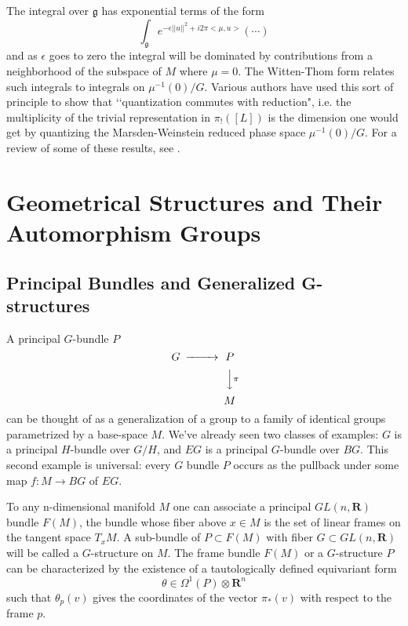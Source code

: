 \documentclass[a4paper,a4paper]{article}
\theoremstyle{conjecture}
\begin{document}
The integral over $\mathfrak g$ has exponential terms of the form
$$\int_{\mathfrak g}e^{-\epsilon ||u||^2 +i2\pi<\mu,u>} (\cdots)$$
and as $\epsilon$ goes to zero the integral will be dominated by contributions from
a neighborhood of the subspace of $M$ where $\mu=0$.  The Witten-Thom form relates
such integrals to integrals on $\mu^{-1}(0)/G$.  Various authors
have used this sort of principle to show that \lq\lq quantization commutes with
reduction", i.e. the multiplicity of the trivial representation in $\pi_!([L])$
is the dimension one would get by quantizing the Marsden-Weinstein reduced
phase space $\mu^{-1}(0)/G$.  For a review of some of these results, see
\cite{Sjamaar}.


\section{Geometrical Structures and Their Automorphism Groups}

\subsection{Principal Bundles and Generalized G-structures}

A principal $G$-bundle $P$
\begin {equation*}
\begin{CD}
G @>>>P \\
@. @VV\pi V\\
{} @. M
\end{CD}
\end{equation*}
can be thought of as a generalization of a group to a family of identical groups 
parametrized by a base-space $M$.  We've already seen two classes of examples: $G$ is a principal $H$-bundle
over $G/H$, and $EG$ is a principal $G$-bundle over $BG$.  This second example is universal: every
$G$ bundle $P$ occurs as the pullback under some map $f:M\rightarrow BG$ of $EG$.

To any n-dimensional manifold $M$ one can associate a principal $GL(n,{\mathbf R})$ bundle $F(M)$, the bundle whose
fiber above $x\in M$ is the set of linear frames on the tangent space $T_xM$.  A sub-bundle of
$P\subset F(M)$ with fiber $G\subset GL(n,{\mathbf R})$ will be called a $G$-structure on $M$.  
The frame bundle $F(M)$ or a 
$G$-structure $P$ can be characterized by the existence of a tautologically defined equivariant form
$$\theta \in \Omega^1(P)\otimes \mathbf R^n$$
such that $\theta _p (v)$ gives the coordinates of the vector $\pi _* (v)$ with respect to the frame $p$.
\end{document}
